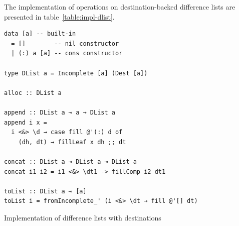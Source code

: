 \documentclass[english]{jflart}
\begin{document}


The implementation of operations on destination-backed difference lists are presented in table~\ref{table:impl-dlist}.
\begin{table}[t]
\small
\begin{verbatim}
data [a] -- built-in
  = []        -- nil constructor
  | (:) a [a] -- cons constructor

type DList a = Incomplete [a] (Dest [a])

alloc :: DList a

append :: DList a ⊸ a → DList a
append i x =
  i <&> \d → case fill @'(:) d of
    (dh, dt) → fillLeaf x dh ;; dt

concat :: DList a ⊸ DList a ⊸ DList a
concat i1 i2 = i1 <&> \dt1 -> fillComp i2 dt1

toList :: DList a ⊸ [a]
toList i = fromIncomplete_' (i <&> \dt → fill @'[] dt)
\end{verbatim}
\caption{Implementation of difference lists with destinations}
\label{table:impl-dlist}
\end{table}
\end{document}
